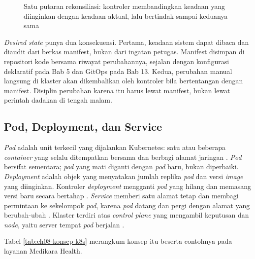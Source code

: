 \begin{figure}[!htb]
  \centering
  
  \caption{Satu putaran rekonsiliasi: kontroler membandingkan keadaan yang diinginkan dengan keadaan
           aktual, lalu bertindak sampai keduanya sama}
  \label{fig:ch08-rekonsiliasi}
\end{figure}

\textit{Desired state} punya dua konsekuensi. Pertama, keadaan sistem dapat dibaca dan diaudit dari
berkas manifest, bukan dari ingatan petugas. Manifest disimpan di repositori kode bersama riwayat
perubahannya, sejalan dengan konfigurasi deklaratif pada Bab 5 dan GitOps pada Bab 13. Kedua,
perubahan manual langsung di klaster akan dikembalikan oleh kontroler bila bertentangan dengan
manifest. Disiplin perubahan karena itu harus lewat manifest, bukan lewat perintah dadakan di
tengah malam.

\subsection{Pod, Deployment, dan Service}

\textit{Pod} adalah unit terkecil yang dijalankan Kubernetes: satu atau beberapa
\textit{container} yang selalu ditempatkan bersama dan berbagi alamat jaringan
\cite{c08-k8s-pods}. \textit{Pod} bersifat sementara; \textit{pod} yang mati diganti dengan
\textit{pod} baru, bukan diperbaiki. \textit{Deployment} adalah objek yang menyatakan jumlah replika
\textit{pod} dan versi \textit{image} yang diinginkan. Kontroler \textit{deployment} mengganti
\textit{pod} yang hilang dan memasang versi baru secara bertahap \cite{c08-k8s-deployment}.
\textit{Service} memberi satu alamat tetap dan membagi permintaan ke sekelompok \textit{pod},
karena \textit{pod} datang dan pergi dengan alamat yang berubah-ubah \cite{c08-k8s-service}. Klaster
terdiri atas \textit{control plane} yang mengambil keputusan dan \textit{node}, yaitu server tempat
\textit{pod} berjalan \cite{c08-k8s-components}.

Tabel \ref{tab:ch08-konsep-k8s} merangkum konsep itu beserta contohnya pada layanan Medikara
Health.

